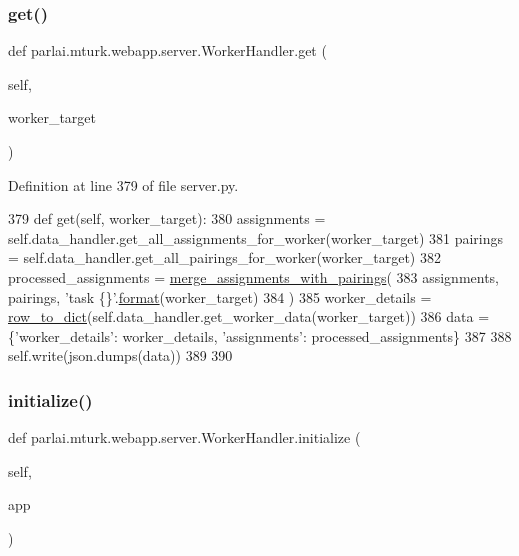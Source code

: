 \subsubsection{\texorpdfstring{get()}{get()}}
{\footnotesize\ttfamily def parlai.\+mturk.\+webapp.\+server.\+Worker\+Handler.\+get (\begin{DoxyParamCaption}\item[{}]{self,  }\item[{}]{worker\+\_\+target }\end{DoxyParamCaption})}



Definition at line 379 of file server.\+py.


\begin{DoxyCode}
379     \textcolor{keyword}{def }get(self, worker\_target):
380         assignments = self.data\_handler.get\_all\_assignments\_for\_worker(worker\_target)
381         pairings = self.data\_handler.get\_all\_pairings\_for\_worker(worker\_target)
382         processed\_assignments = \hyperlink{namespaceparlai_1_1mturk_1_1webapp_1_1server_abe6ddbf97d0e5c26315fa927ed076489}{merge\_assignments\_with\_pairings}(
383             assignments, pairings, \textcolor{stringliteral}{'task \{\}'}.\hyperlink{namespaceparlai_1_1chat__service_1_1services_1_1messenger_1_1shared__utils_a32e2e2022b824fbaf80c747160b52a76}{format}(worker\_target)
384         )
385         worker\_details = \hyperlink{namespaceparlai_1_1mturk_1_1webapp_1_1server_a92be47964fa33a4b6a14d4069d091c7d}{row\_to\_dict}(self.data\_handler.get\_worker\_data(worker\_target))
386         data = \{\textcolor{stringliteral}{'worker\_details'}: worker\_details, \textcolor{stringliteral}{'assignments'}: processed\_assignments\}
387 
388         self.write(json.dumps(data))
389 
390 
\end{DoxyCode}
\mbox{\label{classparlai_1_1mturk_1_1webapp_1_1server_1_1WorkerHandler_a6e358648dc6628021fe6384d2741c2cc}} 
\subsubsection{\texorpdfstring{initialize()}{initialize()}}
{\footnotesize\ttfamily def parlai.\+mturk.\+webapp.\+server.\+Worker\+Handler.\+initialize (\begin{DoxyParamCaption}\item[{}]{self,  }\item[{}]{app }\end{DoxyParamCaption})}



